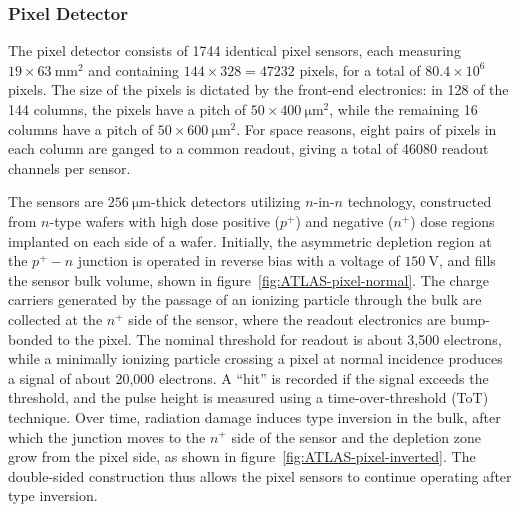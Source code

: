 \subsubsection{Pixel Detector}\label{sec:ATLAS-id-pixel-detector}

The pixel detector consists of 1744 identical pixel sensors, each measuring $19\times\SI{63}{\milli\meter\tothe{2}}$ and containing $144\times 328=47232$ pixels, for a total of $80.4\times 10^6$ pixels. The size of the pixels is dictated by the front-end electronics: in 128 of the 144 columns, the pixels have a pitch of $50\times \SI{400}{\micro\meter\tothe{2}}$, while the remaining 16 columns have a pitch of $50\times \SI{600}{\micro\meter\tothe{2}}$. For space reasons, eight pairs of pixels in each column are ganged to a common readout, giving a total of 46080 readout channels per sensor.

 The sensors are $\SI{256}{\micro\meter}$-thick detectors utilizing $n$-in-$n$ technology, constructed from $n$-type wafers with high dose positive ($p^+$) and negative ($n^+$) dose regions implanted on each side of a wafer. Initially, the asymmetric depletion region at the $p^+-n$ junction is operated in reverse bias with a voltage of $\SI{150}{\volt}$, and fills the sensor bulk volume, shown in figure~\ref{fig:ATLAS-pixel-normal}. The charge carriers generated by the passage of an ionizing particle through the bulk are collected at the $n^+$ side of the sensor, where the readout electronics are bump-bonded to the pixel. The nominal threshold for readout is about 3,500 electrons, while a minimally ionizing particle crossing a pixel at normal incidence produces a signal of about 20,000 electrons. A ``hit'' is recorded if the signal exceeds the threshold, and the pulse height is measured using a time-over-threshold (ToT) technique. Over time, radiation damage induces type inversion in the bulk, after which the junction moves to the $n^+$ side of the sensor and the depletion zone grow from the pixel side, as shown in figure~\ref{fig:ATLAS-pixel-inverted}. The double-sided construction thus allows the pixel sensors to continue operating after type inversion.


